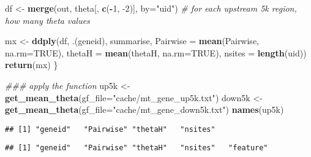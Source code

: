\documentclass[]{article}
\newenvironment{Shaded}{\begin{snugshade}}{\end{snugshade}}
\newcommand{\CommentTok}[1]{\textcolor[rgb]{0.56,0.35,0.01}{\textit{#1}}}
\newcommand{\DataTypeTok}[1]{\textcolor[rgb]{0.13,0.29,0.53}{#1}}
\newcommand{\DecValTok}[1]{\textcolor[rgb]{0.00,0.00,0.81}{#1}}
\newcommand{\KeywordTok}[1]{\textcolor[rgb]{0.13,0.29,0.53}{\textbf{#1}}}
\newcommand{\NormalTok}[1]{#1}
\newcommand{\OperatorTok}[1]{\textcolor[rgb]{0.81,0.36,0.00}{\textbf{#1}}}
\newcommand{\OtherTok}[1]{\textcolor[rgb]{0.56,0.35,0.01}{#1}}
\newcommand{\StringTok}[1]{\textcolor[rgb]{0.31,0.60,0.02}{#1}}
\begin{document}
\begin{Shaded}
\begin{Highlighting}[]
\NormalTok{  df <-}\StringTok{ }\KeywordTok{merge}\NormalTok{(out, theta[, }\KeywordTok{c}\NormalTok{(}\OperatorTok{-}\DecValTok{1}\NormalTok{, }\DecValTok{-2}\NormalTok{)], }\DataTypeTok{by=}\StringTok{"uid"}\NormalTok{)}
  \CommentTok{# for each upstream 5k region, how many theta values}

\NormalTok{  mx <-}\StringTok{ }\KeywordTok{ddply}\NormalTok{(df, .(geneid), summarise,}
            \DataTypeTok{Pairwise =} \KeywordTok{mean}\NormalTok{(Pairwise, }\DataTypeTok{na.rm=}\OtherTok{TRUE}\NormalTok{),}
            \DataTypeTok{thetaH =} \KeywordTok{mean}\NormalTok{(thetaH, }\DataTypeTok{na.rm=}\OtherTok{TRUE}\NormalTok{),}
            \DataTypeTok{nsites =} \KeywordTok{length}\NormalTok{(uid))}
  \KeywordTok{return}\NormalTok{(mx)}
\NormalTok{\}}
\end{Highlighting}
\end{Shaded}

\begin{Shaded}
\begin{Highlighting}[]
\CommentTok{### apply the function}
\NormalTok{up5k <-}\StringTok{ }\KeywordTok{get_mean_theta}\NormalTok{(}\DataTypeTok{gf_file=}\StringTok{"cache/mt_gene_up5k.txt"}\NormalTok{)}
\NormalTok{down5k <-}\StringTok{ }\KeywordTok{get_mean_theta}\NormalTok{(}\DataTypeTok{gf_file=}\StringTok{"cache/mt_gene_down5k.txt"}\NormalTok{)}
\KeywordTok{names}\NormalTok{(up5k)}
\end{Highlighting}
\end{Shaded}

\begin{verbatim}
## [1] "geneid"   "Pairwise" "thetaH"   "nsites"
\end{verbatim}

\begin{Shaded}
\end{Shaded}

\begin{verbatim}
## [1] "geneid"   "Pairwise" "thetaH"   "nsites"   "feature"
\end{verbatim}
\end{document}
